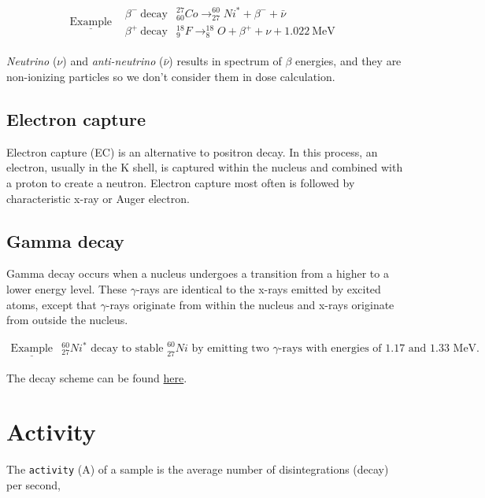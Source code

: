 \documentclass[]{book}
\theoremstyle{definition}
\theoremstyle{definition}
\theoremstyle{definition}
\theoremstyle{remark}
\begin{document}
\[
\begin{matrix}
\underline{\text{Example}} & \begin{matrix}
    \beta^-\  \text{decay}& _{60}^{27}Co\rightarrow _{27}^{60}Ni^{*} +\beta^- + \bar\nu \\ 
    \beta^+\  \text{decay} & _{9}^{18}F\rightarrow _{8}^{18}O +\beta^+ +\nu + 1.022\ \text{MeV}
  \end{matrix}
\end{matrix}
\]

\emph{Neutrino} (\(\nu\)) and \emph{anti-neutrino} (\(\bar \nu\))
results in spectrum of \(\beta\) energies, and they are non-ionizing
particles so we don't consider them in dose calculation.

\subsection{Electron capture}\label{ec}

Electron capture (EC) is an alternative to positron decay. In this
process, an electron, usually in the K shell, is captured within the
nucleus and combined with a proton to create a neutron. Electron capture
most often is followed by characteristic x-ray or Auger electron.

\subsection{Gamma decay}\label{gamma}

Gamma decay occurs when a nucleus undergoes a transition from a higher
to a lower energy level. These \(\gamma\)-rays are identical to the
x-rays emitted by excited atoms, except that \(\gamma\)-rays originate
from within the nucleus and x-rays originate from outside the nucleus.

\[
\begin{matrix}
\underline{\text{Example}} & _{27}^{60}Ni^{*} \text{ decay to stable }_{27}^{60}Ni \text{ by emitting two } \gamma \text{-rays with energies of 1.17 and 1.33 MeV.}
\end{matrix}
\]

The decay scheme can be found
\href{http://atom.kaeri.re.kr:8080/gamrays.html}{here}.

\section{Activity}\label{activity}

The \texttt{activity} (A) of a sample is the average number of
disintegrations (decay) per second,
\end{document}
